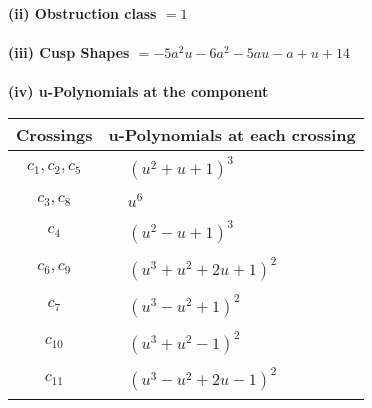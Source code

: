 \documentclass[1p]{elsarticle_modified}
\theoremstyle{definition}
\begin{document}
\flushleft \textbf{(ii) Obstruction class $= 1$}\\~\\
\flushleft \textbf{(iii) Cusp Shapes $= -5 a^2 u-6 a^2-5 a u- a+u+14$}\\~\\
\newpage\renewcommand{\arraystretch}{1}
\flushleft \textbf{(iv) u-Polynomials at the component}\newline \\
\begin{tabular}{m{50pt}|m{274pt}}
Crossings & \hspace{64pt}u-Polynomials at each crossing \\
\hline $$\begin{aligned}c_{1},c_{2},c_{5}\end{aligned}$$&$\begin{aligned}
&(u^2+u+1)^3
\end{aligned}$\\
\hline $$\begin{aligned}c_{3},c_{8}\end{aligned}$$&$\begin{aligned}
&u^6
\end{aligned}$\\
\hline $$\begin{aligned}c_{4}\end{aligned}$$&$\begin{aligned}
&(u^2- u+1)^3
\end{aligned}$\\
\hline $$\begin{aligned}c_{6},c_{9}\end{aligned}$$&$\begin{aligned}
&(u^3+u^2+2 u+1)^2
\end{aligned}$\\
\hline $$\begin{aligned}c_{7}\end{aligned}$$&$\begin{aligned}
&(u^3- u^2+1)^2
\end{aligned}$\\
\hline $$\begin{aligned}c_{10}\end{aligned}$$&$\begin{aligned}
&(u^3+u^2-1)^2
\end{aligned}$\\
\hline $$\begin{aligned}c_{11}\end{aligned}$$&$\begin{aligned}
&(u^3- u^2+2 u-1)^2
\end{aligned}$\\
\hline
\end{tabular}\\~\\
\end{document}
